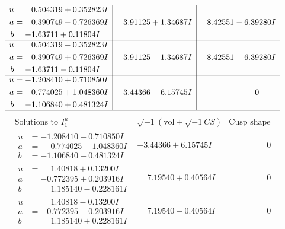 \documentclass[1p]{elsarticle_modified}
\theoremstyle{definition}
\newcommand{\I}{\sqrt{-1}}
\begin{document}
$$\begin{array}{c|c|c}
\begin{aligned}
u &= \phantom{-}0.504319 + 0.352823 I \\
a &= \phantom{-}0.390749 - 0.726369 I \\
b &= -1.63711 + 0.11804 I\end{aligned}
 & \phantom{-}3.91125 + 1.34687 I & \phantom{-}8.42551 - 6.39280 I \\ \hline\begin{aligned}
u &= \phantom{-}0.504319 - 0.352823 I \\
a &= \phantom{-}0.390749 + 0.726369 I \\
b &= -1.63711 - 0.11804 I\end{aligned}
 & \phantom{-}3.91125 - 1.34687 I & \phantom{-}8.42551 + 6.39280 I \\ \hline\begin{aligned}
u &= -1.208410 + 0.710850 I \\
a &= \phantom{-}0.774025 + 1.048360 I \\
b &= -1.106840 + 0.481324 I\end{aligned}
 & -3.44366 - 6.15745 I & \phantom{-0.000000 } 0\\
 \hline 
 \end{array}$$\newpage$$\begin{array}{c|c|c}  
\text{Solutions to }I^u_{1}& \I (\text{vol} + \sqrt{-1}CS) & \text{Cusp shape}\\
 \hline 
\begin{aligned}
u &= -1.208410 - 0.710850 I \\
a &= \phantom{-}0.774025 - 1.048360 I \\
b &= -1.106840 - 0.481324 I\end{aligned}
 & -3.44366 + 6.15745 I & \phantom{-0.000000 } 0 \\ \hline\begin{aligned}
u &= \phantom{-}1.40818 + 0.13200 I \\
a &= -0.772395 + 0.203916 I \\
b &= \phantom{-}1.185140 - 0.228161 I\end{aligned}
 & \phantom{-}7.19540 + 0.40564 I & \phantom{-0.000000 } 0 \\ \hline\begin{aligned}
u &= \phantom{-}1.40818 - 0.13200 I \\
a &= -0.772395 - 0.203916 I \\
b &= \phantom{-}1.185140 + 0.228161 I\end{aligned}
 & \phantom{-}7.19540 - 0.40564 I & \phantom{-0.000000 } 0 \\ \hline\begin{aligned}

\end{aligned}
\end{array}$$
\end{document}

